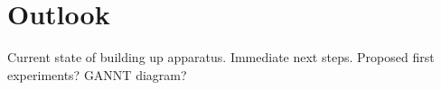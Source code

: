 \documentclass[12pt]{iopart}
\begin{document}




\section{Outlook}
    Current state of building up apparatus.
    Immediate next steps.
    Proposed first experiments?
    GANNT diagram?

  
\end{document}
